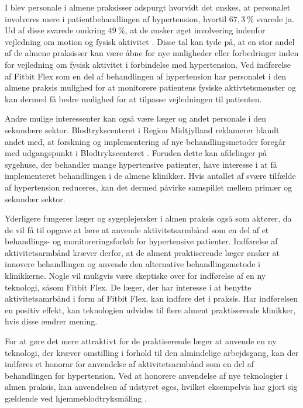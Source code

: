 I  blev personale i almene praksisser adspurgt hvorvidt det ønskes, at personalet involveres mere i patientbehandlingen af hypertension, hvortil $67,3~\%$ svarede ja. Ud af disse svarede omkring $49~\%$, at de ønsker øget involvering indenfor vejledning om motion og fysisk aktivitet \citep{munck2007}. Disse tal kan tyde på, at en stor andel af de almene praksisser kan være åbne for nye muligheder eller forbedringer inden for vejledning om fysisk aktivitet i forbindelse med hypertension. Ved indførelse af Fitbit Flex som en del af behandlingen af hypertension har personalet i den almene praksis mulighed for at monitorere patientens fysiske aktivtetsmønster og kan dermed få bedre mulighed for at tilpasse vejledningen til patienten. 

Andre mulige interessenter kan også være læger og andet personale i den sekundære sektor. Blodtrykscenteret i Region Midtjylland reklamerer blandt andet med, at forskning og implementering af nye behandlingsmetoder foregår med udgangspunkt i Blodtrykscenteret \citep{aarhusuniversitetshospital}. Foruden dette kan afdelinger på sygehuse, der behandler mange hypertensive patienter, have interesse i at få implementeret behandlingen i de almene klinikker. Hvis antallet af svære tilfælde af hypertension reduceres, kan det dermed påvirke samspillet mellem primær og sekundær sektor. 

Yderligere fungerer læger og sygeplejersker i almen praksis også som aktører, da de vil få til opgave at lære at anvende aktivitetsarmbånd som en del af et behandlings- og monitoreringsforløb for hypertensive patienter. 
Indførelse af aktivitetsarmbånd kræver derfor, at de alment praktiserende læger ønsker at innovere behandlingen og anvende den alternative behandlingsmetode i klinikkerne. Nogle vil muligvis være skeptiske over for indførelse af en ny teknologi, såsom Fitbit Flex. De læger, der har interesse i at benytte aktivitetsamrbånd i form af Fitbit Flex, kan indføre det i praksis. Har indførelsen en positiv effekt, kan teknologien udvides til flere alment praktiserende klinikker, hvis disse ændrer mening.

For at gøre det mere attraktivt for de praktiserende læger at anvende en ny teknologi, der kræver omstilling i forhold til den almindelige arbejdsgang, kan der indføres et honorar for anvendelse af aktivitetsarmbånd som en del af behandlingen for hypertension. Ved at honorere anvendelse af nye teknologier i almen praksis, kan anvendelsen af udstyret øges, hvilket eksempelvis har gjort sig gældende ved hjemmeblodtryksmåling \citep{bang2006}.